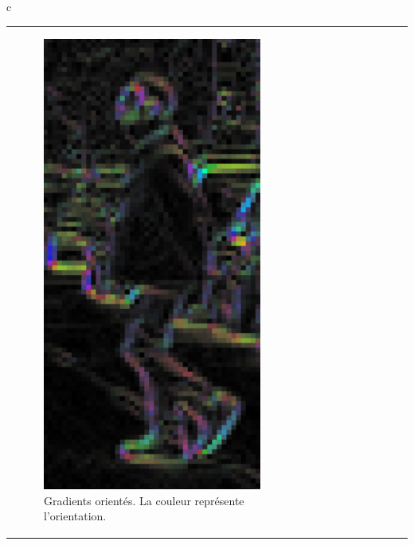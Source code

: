 \begin{table}
\begin{center}
\begin{tabular}  {c}
\begin{tabular} [t]{lcr}
\begin{subfigure}{0.2\textwidth}
						\includegraphics[width=0.9\textwidth]{Chapter2/graphics/pedestrian_hog_grad.png} 
						\caption{Gradients orientés. La couleur représente l'orientation.}
						\vspace{10pt}
					\end{subfigure}	
					&
					\begin{subfigure}{0.2\textwidth}

\end{subfigure}
\end{tabular}
\end{tabular}
\end{center}
\end{table}
